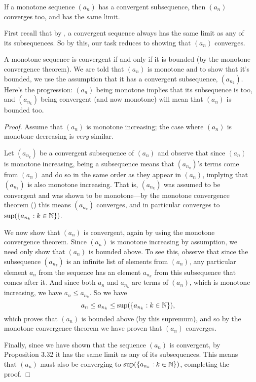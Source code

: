 \begin{proposition}
  If a monotone sequence $(a_n)$ has a convergent subsequence, then
  $(a_n)$ converges too, and has the same limit.
\end{proposition}

\begin{proofidea}
  First recall that by
  , a
  convergent sequence always has the same limit as any of its
  subsequences. So by this, our task reduces to showing that $(a_n)$ converges.

  A monotone sequence is convergent if and only if it is bounded (by
  the monotone convergence theorem). We are told that $(a_n)$ is
  monotone and to show that it's bounded, we use the assumption that
  it has a convergent subsequence, $(a_{n_k})$. Here's the
  progression: $(a_n)$ being monotone implies that its subsequence is
  too, and $(a_{n_k})$ being convergent (and now monotone) will mean
  that $(a_n)$ is bounded too.
\end{proofidea}

\begin{proof}
  Assume that $(a_n)$ is monotone increasing; the case where $(a_n)$
  is monotone decreasing is \textit{very} similar.

  Let $(a_{n_k})$ be a convergent subsequence of $(a_n)$ and observe
  that since $(a_n)$ is monotone increasing, being a subsequence
  means that $(a_{n_k})$'s terms come from $(a_n)$ and do so in the
  same order as they appear in $(a_n)$, implying that $(a_{n_k})$ is
  also monotone increasing. That is, $(a_{n_k})$ was assumed to be
  convergent and was shown to be monotone---by the monotone
  convergence theorem () this means
  $(a_{n_k})$ converges, and in particular converges to
  $\sup(\{a_{n_k} : k \in \mathbb N\})$.

  We now show that $(a_n)$ is convergent, again by using the monotone
  convergence theorem. Since $(a_n)$ is monotone increasing by
  assumption, we need only show that $(a_n)$ is bounded above. To see
  this, observe that since the subsequence $(a_{n_k})$ is an infinite
  list of elements from $(a_n)$, any particular element $a_n$ from
  the sequence has an element $a_{n_k}$ from this subsequence that
  comes after it. And since both $a_n$ and $a_{n_k}$ are terms of
  $(a_n)$, which is monotone increasing, we have $a_n \leq a_{n_k}$. So we have
  \[ a_n \leq a_{n_k} \leq \sup(\{a_{n_k} : k \in \mathbb N\}), \]
  which proves that $(a_n)$ is bounded above (by this supremum), and
  so by the monotone convergence theorem we have proven that $(a_n)$ converges.

  Finally, since we have shown that the sequence $(a_n)$ is
  convergent, by Proposition 3.32 it has the same limit as any of its
  subsequences. This means that $(a_n)$ must also be converging to
  $\sup(\{a_{n_k} : k \in \mathbb N\})$, completing the proof.
\end{proof}

